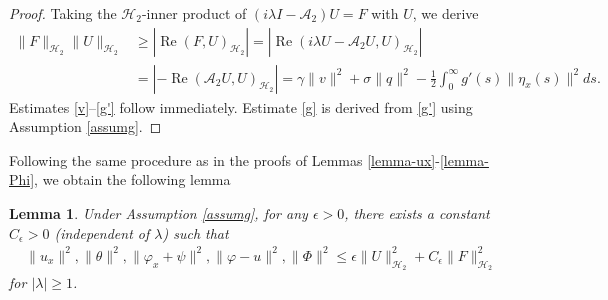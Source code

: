 \documentclass[11pt,reqno]{article}
\newtheorem{lemma}[theorem]{Lemma}
\begin{document}
\begin{proof}
	Taking the $\mathcal{H}_2$-inner product of $(i\lambda I-\mathcal{A}_2)U=F$ with $U$, we derive
	\begin{align*}
		\|F\|_{\mathcal{H}_2}\|U\|_{\mathcal{H}_2}
		&\geq |\operatorname{Re}(F,U)_{\mathcal{H}_2}| = |\operatorname{Re}(i\lambda U-\mathcal{A}_2U,U)_{\mathcal{H}_2}| \\
		& = |-\operatorname{Re}(\mathcal{A}_2U,U)_{\mathcal{H}_2}| = \gamma \|v\|^2 + \sigma \|q\|^2 - \frac{1}{2}\int_{0}^{\infty} g'(s)\|\eta_x(s)\|^2ds.
	\end{align*}
	Estimates \eqref{v}--\eqref{g'} follow immediately. Estimate \eqref{g} is derived from \eqref{g'} using Assumption \ref{assumg}.
\end{proof}

Following the same procedure as in the proofs of Lemmas \ref{lemma-ux}-\ref{lemma-Phi}, we obtain the following lemma\\
\begin{lemma}\label{boundedness:ux}
	Under Assumption \ref{assumg}, for any $\epsilon>0$, there exists a constant $C_{\epsilon}>0$ (independent of $\lambda$) such that
	\begin{align}
		\|u_x\|^2, \|\theta\|^2, \|\varphi_x + \psi\|^2, \|\varphi - u\|^2, \|\Phi\|^2 \leq \epsilon\|U\|_{\mathcal{H}_2}^2 + C_{\epsilon}\|F\|_{\mathcal{H}_2}^2
	\end{align}
	for $|\lambda| \geq 1$.
\end{lemma}
\end{document}
